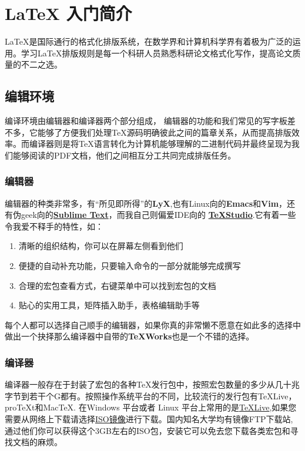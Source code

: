 \section{LaTeX 入门简介}
\LaTeX 是国际通行的格式化排版系统，在数学界和计算机科学界有着极为广泛的运用。学习\LaTeX 排版规则是每一个科研人员熟悉科研论文格式化写作，提高论文质量的不二之选。
\subsection{编辑环境}
编译环境由编辑器和编译器两个部分组成， 编辑器的功能和我们常见的写字板差不多，它能够了方便我们处理\TeX 源码明确彼此之间的篇章关系，从而提高排版效率。而编译器则是将\TeX 语言转化为计算机能够理解的二进制代码并最终呈现为我们能够阅读的PDF文档，他们之间相互分工共同完成排版任务。
\subsubsection{编辑器}
编辑器的种类非常多，有“所见即所得”的\textbf{LyX},也有Linux向的\textbf{Emacs}和\textbf{Vim}，还有伪geek向的\href{http://www.sublimetext.com/}{\textbf{Sublime Text}}，而我自己则偏爱IDE向的
\href{http://texstudio.sourceforge.net/}{\textbf{\TeX Studio}}.它有着一些令我爱不释手的特性，如：
\begin{enumerate}
	\item 清晰的组织结构，你可以在屏幕左侧看到他们
	\item 便捷的自动补充功能，只要输入命令的一部分就能够完成撰写
	\item 合理的宏包查看方式，右键菜单中可以找到宏包的文档
	\item 贴心的实用工具，矩阵插入助手，表格编辑助手等
\end{enumerate}

每个人都可以选择自己顺手的编辑器，如果你真的非常懒不愿意在如此多的选择中做出一个抉择那么编译器中自带的\textbf{\TeX Works}也是一个不错的选择。
\subsubsection{编译器}
编译器一般存在于封装了宏包的各种\TeX 发行包中，按照宏包数量的多少从几十兆字节到若干个G都有。按照操作系统平台的不同，比较流行的发行包有\TeX Live，pro\TeX t和Mac\TeX . 在Windows 平台或者 Linux 平台上常用的是\href{https://www.tug.org/texlive/}{\TeX Live},如果您需要从网络上下载请选择\href{https://www.tug.org/texlive/acquire-iso.html}{ISO镜像}进行下载。国内知名大学均有镜像FTP下载站,通过他们你可以获得这个3GB左右的ISO包，安装它可以免去您下载各类宏包和寻找文档的麻烦。
